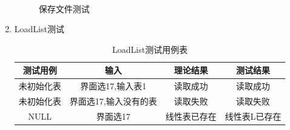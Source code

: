 \documentclass[supercite]{HustGraduPaper}
\theoremstyle{definition}
\begin{document}
\begin{enumerate}
\begin{figure}[htb]
		      \\
		      \caption{保存文件测试}
	      \end{figure}
	      \newpage
	\item LoadList测试
	      \begin{table}[htb]
		      \begin{center}
			      \setlength{\tabcolsep}{2.0mm}
			      \caption{LoadList测试用例表}
			      \label{table23}
			      \begin{tabular}{|c|c|c|c|}
				      \hline
				      测试用例   & 输入                  & 理论结果     & 测试结果      \\
				      \hline
				      \hline
				      未初始化表 & 界面选17,输入表1      & 读取成功     & 读取成功      \\
				      \hline
				      未初始化表 & 界面选17,输入没有的表 & 读取失败     & 读取失败      \\
				      \hline
				      NULL       & 界面选17              & 线性表已存在 & 线性表L已存在 \\
				      \hline
			      \end{tabular}
		      \end{center}
	      \end{table}
	      \begin{figure}[htb]
		      \centering
		      \quad
		      \quad

\end{figure}
\end{enumerate}
\end{document}
